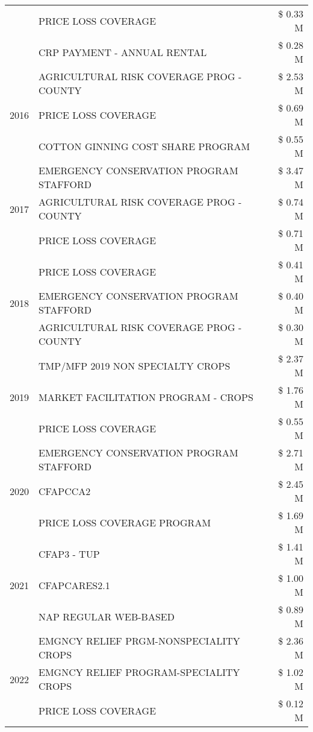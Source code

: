 \begin{tabular}{llr}
 & PRICE LOSS COVERAGE & \$ 0.33 M \\
 & CRP PAYMENT - ANNUAL RENTAL & \$ 0.28 M \\
\cline{1-3}
\multirow[t]{3}{*}{2016} & AGRICULTURAL RISK COVERAGE PROG - COUNTY & \$ 2.53 M \\
 & PRICE LOSS COVERAGE & \$ 0.69 M \\
 & COTTON GINNING COST SHARE PROGRAM & \$ 0.55 M \\
\cline{1-3}
\multirow[t]{3}{*}{2017} & EMERGENCY CONSERVATION PROGRAM STAFFORD & \$ 3.47 M \\
 & AGRICULTURAL RISK COVERAGE PROG - COUNTY & \$ 0.74 M \\
 & PRICE LOSS COVERAGE & \$ 0.71 M \\
\cline{1-3}
\multirow[t]{3}{*}{2018} & PRICE LOSS COVERAGE & \$ 0.41 M \\
 & EMERGENCY CONSERVATION PROGRAM STAFFORD & \$ 0.40 M \\
 & AGRICULTURAL RISK COVERAGE PROG - COUNTY & \$ 0.30 M \\
\cline{1-3}
\multirow[t]{3}{*}{2019} & TMP/MFP 2019 NON SPECIALTY CROPS & \$ 2.37 M \\
 & MARKET FACILITATION PROGRAM - CROPS & \$ 1.76 M \\
 & PRICE LOSS COVERAGE & \$ 0.55 M \\
\cline{1-3}
\multirow[t]{3}{*}{2020} & EMERGENCY CONSERVATION PROGRAM STAFFORD & \$ 2.71 M \\
 & CFAPCCA2 & \$ 2.45 M \\
 & PRICE LOSS COVERAGE PROGRAM & \$ 1.69 M \\
\cline{1-3}
\multirow[t]{3}{*}{2021} & CFAP3 - TUP & \$ 1.41 M \\
 & CFAPCARES2.1 & \$ 1.00 M \\
 & NAP REGULAR WEB-BASED & \$ 0.89 M \\
\cline{1-3}
\multirow[t]{3}{*}{2022} & EMGNCY RELIEF PRGM-NONSPECIALITY CROPS & \$ 2.36 M \\
 & EMGNCY RELIEF PROGRAM-SPECIALITY CROPS & \$ 1.02 M \\
 & PRICE LOSS COVERAGE & \$ 0.12 M \\
\cline{1-3}
\bottomrule
\end{tabular}
